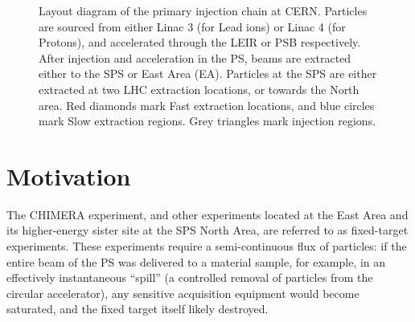 \documentclass[11pt]{report}
\begin{document}
\begin{figure}
  \caption{Layout diagram of the primary injection chain at CERN. Particles are sourced from either Linac 3 (for Lead ions) or Linac 4 (for Protons), and accelerated through the LEIR or PSB respectively. After injection and acceleration in the PS, beams are extracted either to the SPS or East Area (EA). Particles at the SPS are either extracted at two LHC extraction locations, or towards the North area. Red diamonds mark Fast extraction locations, and blue circles mark Slow extraction regions. Grey triangles mark injection regions.}\label{fig:chain}
\end{figure}

\section{Motivation}

The CHIMERA experiment, and other experiments located at the East Area and its higher-energy sister site at the SPS North Area, are referred to as fixed-target experiments. These experiments require a semi-continuous flux of particles: if the entire beam of the PS was delivered to a material sample, for example, in an effectively instantaneous ``spill'' (a controlled removal of particles from the circular accelerator), any sensitive acquisition equipment would become saturated, and the fixed target itself likely destroyed.
\end{document}
